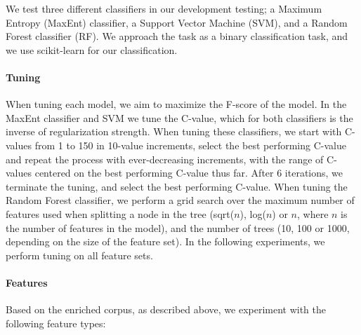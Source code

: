 \documentclass[11pt,letterpaper]{article}
\begin{document}
We test three different classifiers in our development testing; a Maximum Entropy (MaxEnt) classifier, a Support Vector Machine (SVM), and a Random Forest classifier (RF).  We approach the task as a binary classification task, and we use scikit-learn \cite{scikit-learn} for our classification.

\paragraph{Tuning}
When tuning each model, we aim to maximize the F-score of the model. In the MaxEnt classifier and SVM we tune the C-value, which for both classifiers is the inverse of regularization strength. When tuning these classifiers, we start with C-values from 1 to 150 in 10-value increments, select the best performing C-value and repeat the process with ever-decreasing increments, with the range of C-values centered on the best performing C-value thus far. After 6 iterations, we terminate the tuning, and select the best performing C-value. When tuning the Random Forest classifier, we perform a grid search over the maximum number of features used when splitting a node in the tree (sqrt($n$), log($n$) or $n$, where $n$ is the number of features in the model), and the number of trees (10, 100 or 1000, depending on the size of the feature set). In the following experiments, we perform tuning on all feature sets.


\paragraph{Features}
Based on the enriched corpus, as described above, we experiment with the following feature types:
\end{document}
